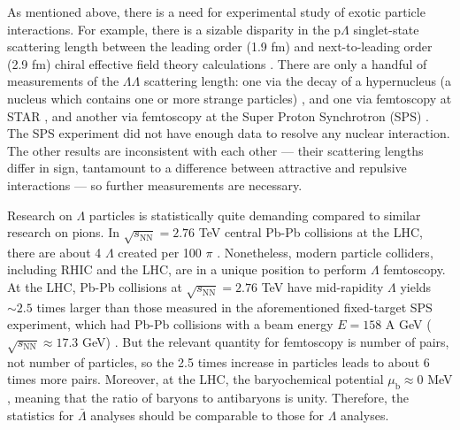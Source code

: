 As mentioned above, there is a need for experimental study of exotic particle interactions.
For example, there is a sizable disparity in the p$\Lambda$ singlet-state scattering length between the leading order (1.9 fm) and next-to-leading order (2.9 fm) chiral effective field theory calculations \cite{Haidenbauer:2013oca}.
There are only a handful of measurements of the $\Lambda\Lambda$ scattering length: one via the decay of a hypernucleus (a nucleus which contains one or more strange particles) \cite{Takahashi:2001nm,Filikhin:2002wm,Hiyama:2002yj}, and one via femtoscopy at STAR \cite{Adamczyk:2014vca}, and another via femtoscopy at the Super Proton Synchrotron (SPS) \cite{Andersen:1999gq}.
The SPS experiment did not have enough data to resolve any nuclear interaction.
The other results are inconsistent with each other --- their scattering lengths differ in sign, tantamount to a difference between attractive and repulsive interactions --- so further measurements are necessary.

Research on $\Lambda$ particles is statistically quite demanding compared to similar research on pions.
In $\sqrt{s_{\mathrm{NN}}}=2.76$ TeV central Pb-Pb collisions at the LHC, there are about 4 $\Lambda$ created per 100 $\pi$ \cite{Zhang:2013fta}.
Nonetheless, modern particle colliders, including RHIC and the LHC, are in a unique position to perform $\Lambda$ femtoscopy.
At the LHC, Pb-Pb collisions at $\sqrt{s_{\mathrm{NN}}}=2.76$ TeV have mid-rapidity $\Lambda$ yields $\sim 2.5$ times larger than those measured in the aforementioned fixed-target SPS experiment, which had Pb-Pb collisions with a beam energy $E = 158$ A GeV ($\sqrt{s_{\mathrm{NN}}} \approx 17.3$ GeV)  \cite{Abelev:2013xaa,Alt:2008qm}.
But the relevant quantity for femtoscopy is number of pairs, not number of particles, so the 2.5 times increase in particles leads to about 6 times more pairs. 
Moreover, at the LHC, the baryochemical potential $\mu_\mathrm{b} \approx 0$ MeV \cite{Stachel:2013zma}, meaning that the ratio of baryons to antibaryons is unity.
Therefore, the statistics for $\bar{\Lambda}$ analyses should be comparable to those for $\Lambda$ analyses.



